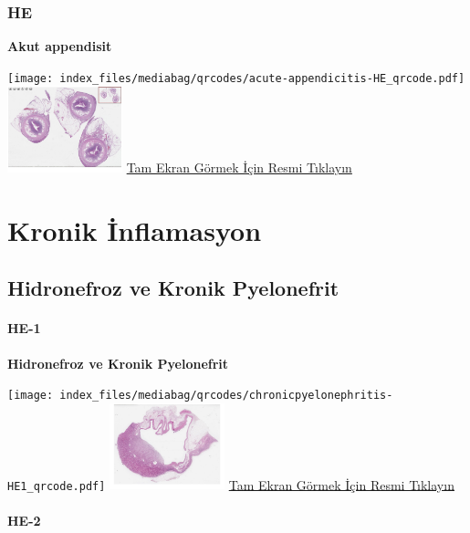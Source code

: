 \documentclass[
  letterpaper,
  DIV=11,
  numbers=noendperiod]{scrreprt}
\begin{document}
\subsection{HE}\label{he-4}

\textbf{Akut appendisit}

\texttt{[image: index\_files/mediabag/qrcodes/acute-appendicitis-HE\_qrcode.pdf]}
\href{https://images.patolojiatlasi.com/acute-appendicitis/HE.html}{\includegraphics[width=0.25\textwidth,height=\textheight]{./screenshots/thumbnail_acute-appendicitis.png}}
\href{https://images.patolojiatlasi.com/acute-appendicitis/HE.html}{Tam
Ekran Görmek İçin Resmi Tıklayın}

\chapter{Kronik İnflamasyon}\label{sec-kronik-inflamasyon}

\section{Hidronefroz ve Kronik
Pyelonefrit}\label{sec-hidronefroz-kronik-pyelonefrit}

\subsubsection{HE-1}\label{he-1-2}

\textbf{Hidronefroz ve Kronik Pyelonefrit}

\texttt{[image: index\_files/mediabag/qrcodes/chronicpyelonephritis-HE1\_qrcode.pdf]}
\href{https://images.patolojiatlasi.com/chronicpyelonephritis/HE1.html}{\includegraphics[width=0.25\textwidth,height=\textheight]{./screenshots/thumbnail_chronicpyelonephritis-1.png}}
\href{https://images.patolojiatlasi.com/chronicpyelonephritis/HE1.html}{Tam
Ekran Görmek İçin Resmi Tıklayın}

\subsubsection{HE-2}\label{he-2-2}
\end{document}
